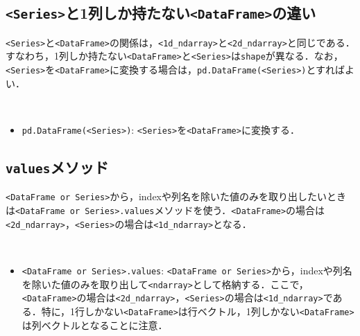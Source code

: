 \subsection{\texttt{<Series>}と1列しか持たない\texttt{<DataFrame>}の違い}
\texttt{<Series>}と\texttt{<DataFrame>}の関係は，\texttt{<1d\_ndarray>}と\texttt{<2d\_ndarray>}と同じである．すなわち，1列しか持たない\texttt{<DataFrame>}と\texttt{<Series>}は\texttt{shape}が異なる．なお，\texttt{<Series>}を\texttt{<DataFrame>}に変換する場合は，\texttt{pd.DataFrame(<Series>)}とすればよい．

\begin{gram}　
\begin{itemize}
\item \texttt{pd.DataFrame(<Series>)}: \texttt{<Series>}を\texttt{<DataFrame>}に変換する．
\end{itemize}
\end{gram}
\begin{cod}[\texttt{pd5.py}]　
}]{code/pd5.py}
\vspace{-10pt}
\begin{lstlisting}
df_sub1=
0    17.5920
1     9.1302
2    13.6620
3    11.8540
4     6.8233
Name: profit, dtype: float64
type=<class 'pandas.core.series.Series'>
shape=(5,)

df_sub2=
   population  profit
2      8.5186  13.662
type=<class 'pandas.core.frame.DataFrame'>
shape=(1, 2)

df_sub3=
    profit
0  17.5920
1   9.1302
2  13.6620
3  11.8540
4   6.8233
type=<class 'pandas.core.frame.DataFrame'>
shape=(5, 1)
\end{lstlisting}
\end{cod}
\vspace{-10pt}

\subsection{\texttt{values}メソッド}
\texttt{<DataFrame or Series>}から，indexや列名を除いた値のみを取り出したいときは\texttt{<DataFrame or Series>.values}メソッドを使う．\texttt{<DataFrame>}の場合は\texttt{<2d\_ndarray>}，\texttt{<Series>}の場合は\texttt{<1d\_ndarray>}となる．

\begin{gram}　
\begin{itemize}
\item \texttt{<DataFrame or Series>.values}: \texttt{<DataFrame or Series>}から，indexや列名を除いた値のみを取り出して\texttt{<ndarray>}として格納する．ここで，\texttt{<DataFrame>}の場合は\texttt{<2d\_ndarray>}，\texttt{<Series>}の場合は\texttt{<1d\_ndarray>}である．特に，1行しかない\texttt{<DataFrame>}は行ベクトル，1列しかない\texttt{<DataFrame>}は列ベクトルとなることに注意．
\end{itemize}
\end{gram}


